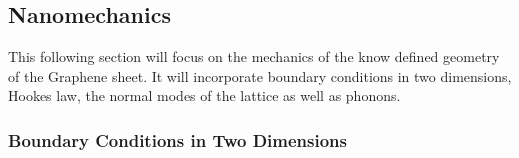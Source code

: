 \subsection{Nanomechanics}
This following section will focus on the mechanics of the know defined geometry of the Graphene sheet. It will incorporate boundary conditions in two dimensions, Hookes law, the normal modes of the lattice as well as phonons. 

\subsubsection{Boundary Conditions in Two Dimensions}

